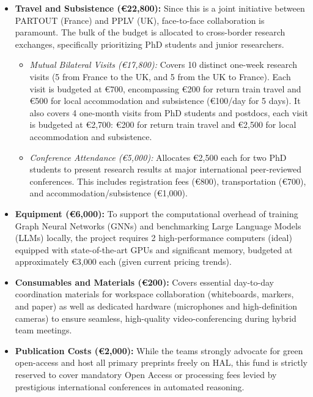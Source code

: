 \documentclass[a4paper]{article}
\begin{document}
\begin{itemize}
    \item \textbf{Travel and Subsistence (\euro 22,800):} Since this is a joint initiative between PARTOUT (France) and PPLV (UK), face-to-face collaboration is paramount. The bulk of the budget is allocated to cross-border research exchanges, specifically prioritizing PhD students and junior researchers.
    \begin{itemize}
        \item \textit{Mutual Bilateral Visits (\euro 17,800):} Covers 10 distinct one-week research visits (5 from France to the UK, and 5 from the UK to France). Each visit is budgeted at \euro 700, encompassing \euro 200 for return train travel and \euro 500 for local accommodation and subsistence (\euro 100/day for 5 days). It also covers 4 one-month visits from PhD students and postdocs, each visit is budgeted at \euro 2,700: \euro 200 for return train travel and \euro 2,500 for local accommodation and subsistence.
        \item \textit{Conference Attendance (\euro 5,000):} Allocates \euro 2,500 each for two PhD students to present research results at major international peer-reviewed conferences. This includes registration fees (\euro 800), transportation (\euro 700), and accommodation/subsistence (\euro 1,000).
    \end{itemize}

    \item \textbf{Equipment (\euro 6,000):} To support the computational overhead of training Graph Neural Networks (GNNs) and benchmarking Large Language Models (LLMs) locally, the project requires 2 high-performance computers (ideal) equipped with state-of-the-art GPUs and significant memory, budgeted at approximately \euro 3,000 each (given current pricing trends).

    \item \textbf{Consumables and Materials (\euro 200):} Covers essential day-to-day coordination materials for workspace collaboration (whiteboards, markers, and paper) as well as dedicated hardware (microphones and high-definition cameras) to ensure seamless, high-quality video-conferencing during hybrid team meetings.

    \item \textbf{Publication Costs (\euro 2,000):} While the teams strongly advocate for green open-access and host all primary preprints freely on HAL, this fund is strictly reserved to cover mandatory Open Access or processing fees levied by prestigious international conferences in automated reasoning.


\end{itemize}
\end{document}
